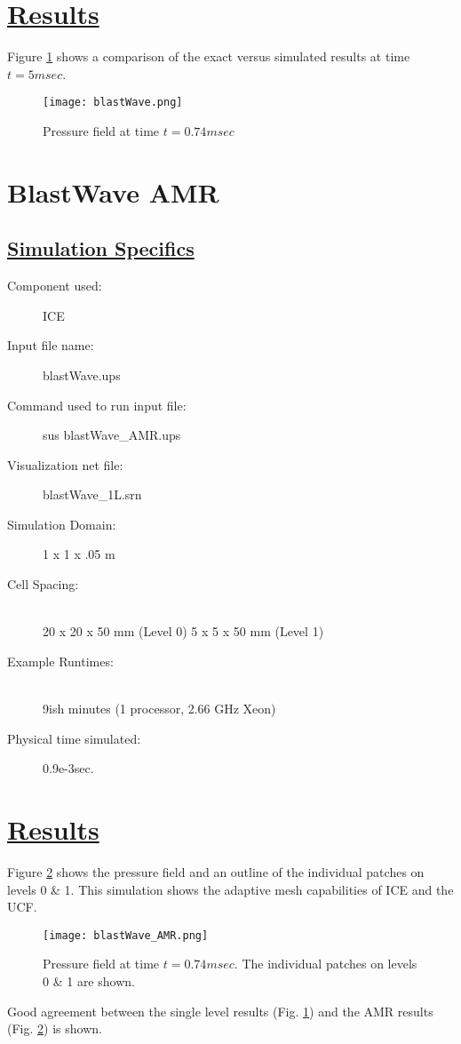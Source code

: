 \section*{\underline{Results}}
Figure \ref{results.BW} shows a comparison of the exact versus simulated
results at time $t = 5msec$.

\begin{figure}
  \texttt{[image: blastWave.png]}
  \caption{Pressure field at time $t = 0.74msec$}
  \label{results.BW}
  \end{figure}
\newpage


\section*{\center BlastWave AMR}
\subsection*{\underline{Simulation Specifics}}
\begin{description} 
\item [Component used:] \hfill ICE
\item [Input file name:] \hfill blastWave.ups
\item [Command used to run input file:]\hfill sus blastWave\_AMR.ups
\item [Visualization net file:]\hfill blastWave\_1L.srn\\


\item [Simulation Domain:]\hfill    1 x 1 x .05 m
\item [Cell Spacing:]\hfill \\ 
20 x 20 x 50 mm (Level 0) 
5 x 5 x 50 mm (Level 1)


\item [Example Runtimes:] \hfill \\
 9ish minutes   (1 processor, 2.66 GHz Xeon)

\item [Physical time simulated:] \hfill 0.9e-3sec.

\end{description}

\section*{\underline{Results}}
Figure \ref{results.BW.AMR} shows the pressure field and an outline of the
individual patches on levels 0 \& 1.  This simulation shows the adaptive
mesh capabilities of ICE and the UCF.
\begin{figure}
  \texttt{[image: blastWave\_AMR.png]}
  \caption{Pressure field at time $t = 0.74msec$.  The individual patches on levels 0 \& 1 are shown.}
  \label{results.BW.AMR}
  \end{figure}
Good agreement between the single level results (Fig. \ref{results.BW}) and the AMR results (Fig.
\ref{results.BW.AMR}) is shown.
\newpage

